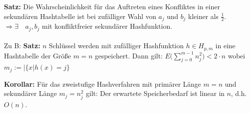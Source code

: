 \documentclass[fleqn]{scrartcl}
\begin{document}
\textbf{Satz:} Die Wahrscheinlichkeit für das Auftreten eines Konfliktes in einer sekundären Hashtabelle ist bei zufälliger Wahl von $a_j$ und $b_j$ kleiner als $\frac{1}{2}$.\\
$\Rightarrow \exists \quad a_j, b_j$ mit konfliktfreier sekundärer Hashfunktion.\\\\

Zu B: \textbf{Satz:} $n$ Schlüssel werden mit zufälliger Hashfunktion $h \in H_{p, m}$ in eine Hashtabelle der Größe $m = n$ gespeichert.
Dann gilt: $E\bigg(\sum\limits_{j = 0}^{m-1}n_j^2\bigg) < 2 \cdot n$ wobei $m_j := |\{x | h(x) = j\}$\\


\textbf{Korollar:} Für das zweistufige Hashverfahren mit primärer Länge $m = n$ und sekundärer Länge $m_j = n_j^2$ gilt: Der erwartete Speicherbedarf ist linear in $n$, d.h. $O(n)$.
\end{document}

